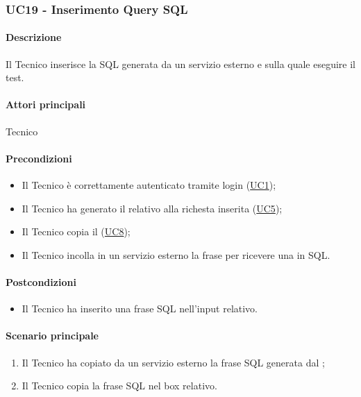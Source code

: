 \subsubsection{UC19 - Inserimento Query SQL}\label{UC19}
\paragraph*{Descrizione}
Il Tecnico inserisce la  SQL generata da un servizio esterno e sulla quale eseguire il test.

\paragraph*{Attori principali}
Tecnico

\paragraph*{Precondizioni}
\begin{itemize}
  \item Il Tecnico è correttamente autenticato tramite login (\hyperref[UC1]{UC1});
  \item Il Tecnico ha generato il  relativo alla richesta inserita (\hyperref[UC5]{UC5});
  \item Il Tecnico copia il  (\hyperref[UC8]{UC8});
  \item Il Tecnico incolla in un servizio esterno la frase per ricevere una  in SQL.
\end{itemize}

\paragraph*{Postcondizioni}
\begin{itemize}
  \item Il Tecnico ha inserito una frase SQL nell'input relativo.
\end{itemize}

\paragraph*{Scenario principale}
\begin{enumerate}
  \item Il Tecnico ha copiato da un servizio esterno la frase SQL generata dal ;
  \item Il Tecnico copia la frase SQL nel box relativo.
\end{enumerate}
